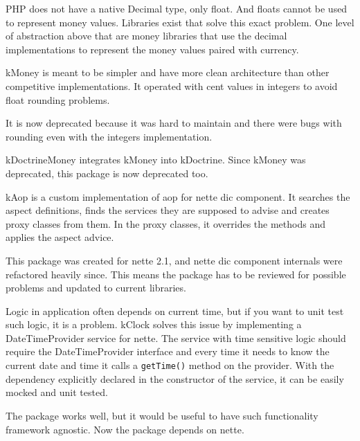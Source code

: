  \label{sec:state:money}

PHP does not have a native Decimal type, only float. And floats cannot be used to represent money values. Libraries exist that solve this exact problem. One level of abstraction above that are money libraries that use the decimal implementations to represent the money values paired with currency.

\gls{kMoney} is meant to be simpler and have more clean architecture than other competitive implementations. It operated with cent values in integers to avoid float rounding problems.

It is now deprecated because it was hard to maintain and there were bugs with rounding even with the integers implementation.

 \label{sec:state:doctrine-money}

\gls{kDoctrineMoney} integrates \gls{kMoney} into \gls{kDoctrine}. Since \gls{kMoney} was deprecated, this package is now deprecated too.

 \label{sec:state:aop}

\gls{kAop} is a custom implementation of \gls{aop} for \gls{nette} \gls{dic} component. It searches the aspect definitions, finds the services they are supposed to advise and creates proxy classes from them. In the proxy classes, it overrides the methods and applies the aspect advice.

This package was created for \gls{nette} 2.1, and \gls{nette} \gls{dic} component internals were refactored heavily since. This means the package has to be reviewed for possible problems and updated to current libraries.

 \label{sec:state:clock}

Logic in application often depends on current time, but if you want to unit test such logic, it is a problem. \gls{kClock} solves this issue by implementing a DateTimeProvider service for \gls{nette}. The service with time sensitive logic should require the DateTimeProvider interface and every time it needs to know the current date and time it calls a \lstinline{getTime()} method on the provider. With the dependency explicitly declared in the constructor of the service, it can be easily mocked and unit tested.

The package works well, but it would be useful to have such functionality framework agnostic. Now the package depends on \gls{nette}.

